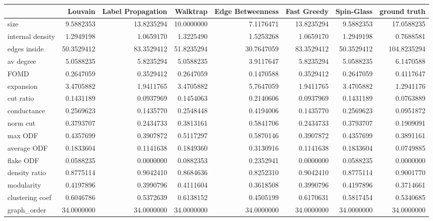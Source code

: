 \begin{table}[ht]
\centering
\begin{tabular}{lrrrrrrr}
  \hline
 & Louvain & Label Propagation & Walktrap & Edge Betweenness & Fast Greedy & Spin-Glass & ground truth \\ 
  \hline
size & 9.5882353 & 13.8235294 & 10.0000000 & 7.1176471 & 13.8235294 & 9.5882353 & 17.0588235 \\ 
  internal density & 1.2949198 & 1.0659170 & 1.3225490 & 1.5253268 & 1.0659170 & 1.2949198 & 0.7688581 \\ 
  edges inside & 50.3529412 & 83.3529412 & 51.8235294 & 30.7647059 & 83.3529412 & 50.3529412 & 104.8235294 \\ 
  av degree & 5.0588235 & 5.8235294 & 5.0588235 & 3.9117647 & 5.8235294 & 5.0588235 & 6.1470588 \\ 
  FOMD & 0.2647059 & 0.3529412 & 0.2647059 & 0.1470588 & 0.3529412 & 0.2647059 & 0.4117647 \\ 
  expansion & 3.4705882 & 1.9411765 & 3.4705882 & 5.7647059 & 1.9411765 & 3.4705882 & 1.2941176 \\ 
  cut ratio & 0.1431189 & 0.0937969 & 0.1454063 & 0.2140606 & 0.0937969 & 0.1431189 & 0.0763889 \\ 
  conductance & 0.2569623 & 0.1435770 & 0.2548448 & 0.4194006 & 0.1435770 & 0.2569623 & 0.0951872 \\ 
  norm cut & 0.3793707 & 0.2434733 & 0.3813161 & 0.5841706 & 0.2434733 & 0.3793707 & 0.1909091 \\ 
  max ODF & 0.4357699 & 0.3907872 & 0.5117297 & 0.5870146 & 0.3907872 & 0.4357699 & 0.3891161 \\ 
  average ODF & 0.1833604 & 0.1141638 & 0.1849360 & 0.3130916 & 0.1141638 & 0.1833604 & 0.0749885 \\ 
  flake ODF & 0.0588235 & 0.0000000 & 0.0882353 & 0.2352941 & 0.0000000 & 0.0588235 & 0.0000000 \\ 
  density ratio & 0.8775114 & 0.9042410 & 0.8684636 & 0.8252310 & 0.9042410 & 0.8775114 & 0.9001770 \\ 
  modularity & 0.4197896 & 0.3990796 & 0.4111604 & 0.3618508 & 0.3990796 & 0.4197896 & 0.3714661 \\ 
  clustering coef & 0.6046786 & 0.5372639 & 0.6138152 & 0.4505199 & 0.6170631 & 0.5817454 & 0.5340685 \\ 
  graph\_order & 34.0000000 & 34.0000000 & 34.0000000 & 34.0000000 & 34.0000000 & 34.0000000 & 34.0000000 \\ 

\end{tabular}
\end{table}
